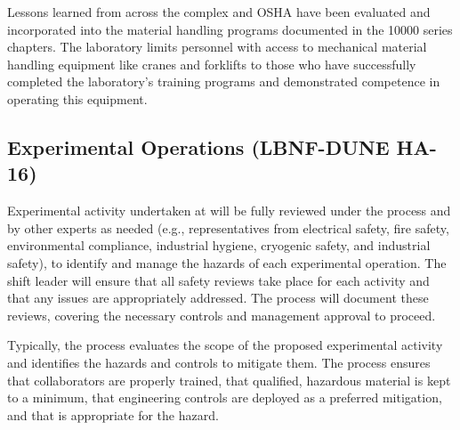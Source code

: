 Lessons learned from across the  complex and OSHA have been
evaluated and incorporated into the \fnal material handling programs
documented in the  10000 series chapters.  The laboratory
limits personnel with access to mechanical material handling equipment
like cranes and forklifts to those who have successfully completed the
laboratory's training programs and demonstrated competence in
operating this equipment.


\subsection{Experimental Operations (LBNF-DUNE HA-16)}
Experimental activity undertaken at  will be
fully reviewed under the  process
and by other experts as needed (e.g., representatives from electrical
safety, fire safety, environmental compliance, industrial hygiene,
cryogenic safety, and industrial safety), to identify and manage the
hazards of each experimental operation. The shift leader will ensure
that all safety reviews take place for each activity and that any
issues are appropriately addressed. The   process will document
these reviews, covering the necessary controls and management approval
to proceed.

Typically, the   process evaluates the scope of the proposed
experimental activity and identifies the hazards and controls to
mitigate them. The process ensures that collaborators are properly
trained, that qualified, hazardous material is kept to a minimum, that
engineering controls are deployed as a preferred mitigation, and that
 is appropriate for the hazard.

